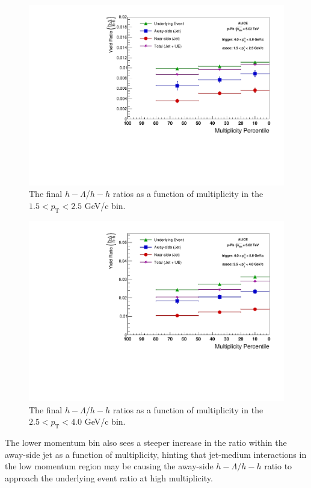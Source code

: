 \documentclass[ALICE,manyauthors]{ALICE_analysis_notes}
\begin{document}
\begin{itemize}
\begin{figure}[ht]
\centering
\includegraphics[width=5in]{figures/v0_ratio_plot_15_25.pdf}
\caption{The final $h-\Lambda$/$h-h$ ratios as a function of multiplicity in the $1.5 < p_{\text{T}} < 2.5$ GeV/c bin.}
\label{low_momentum_ratio}
\end{figure}

\begin{figure}[ht]
\centering
\includegraphics[width=5in]{figures/v0_ratio_plot_25_40.pdf}
\caption{The final $h-\Lambda$/$h-h$ ratios as a function of multiplicity in the $2.5 < p_{\text{T}} < 4.0$ GeV/c bin.}
\label{high_momentum_ratio}
\end{figure}

 The lower momentum bin also sees a steeper increase in the ratio within the away-side jet as a function of multiplicity, hinting that jet-medium interactions in the low momentum region may be causing the away-side $h-\Lambda/h-h$ ratio to approach the underlying event ratio at high multiplicity.


\end{itemize}
\end{document}
